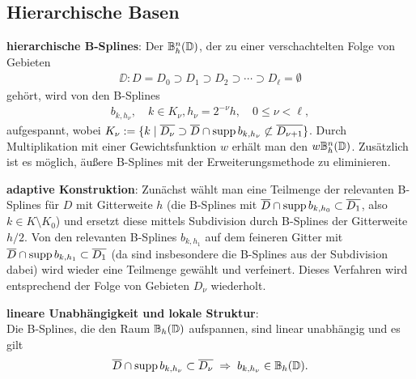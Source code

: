 \subsection{%
    Hierarchische Basen%
}

\textbf{hierarchische B-Splines}:
Der  $\mathbb{B}_h^n(\mathbb{D})$,
der zu einer verschachtelten Folge von Gebieten
\begin{align*}
    \DD\colon D = D_0 \supset D_1 \supset D_2 \supset \dotsb \supset D_\ell = \emptyset
\end{align*}
gehört, wird von den B-Splines
\begin{align*}
    b_{k,h_\nu},\quad
    k \in K_\nu, h_\nu = 2^{-\nu} h,\quad
    0 \le \nu < \ell,
\end{align*}
aufgespannt, wobei $K_\nu := \{k \;|\; \overline{D_\nu} \supset
\overline{D} \cap \operatorname{supp} b_{k,h_\nu} \not\subset \overline{D_{\nu+1}}\}$.
Durch Multiplikation mit einer Gewichtsfunktion $w$ erhält man den
 $w\mathbb{B}_h^n(\mathbb{D})$.
Zusätzlich ist es möglich, äußere B-Splines mit der Erweiterungsmethode zu eliminieren.

\textbf{adaptive Konstruktion}:
Zunächst wählt man eine Teilmenge der relevanten B-Splines für $D$ mit Gitterweite $h$
(die B-Splines mit $\overline{D} \cap \operatorname{supp} b_{k,h_0} \subset \overline{D_1}$, also
$k \in K \setminus K_0$)
und ersetzt diese mittels Subdivision durch B-Splines der Gitterweite $h/2$.
Von den relevanten B-Splines $b_{k,h_1}$ auf dem feineren Gitter mit
$\overline{D} \cap \operatorname{supp} b_{k,h_1} \subset \overline{D_1}$
(da sind insbesondere die B-Splines aus der Subdivision dabei) wird wieder eine Teilmenge
gewählt und verfeinert.
Dieses Verfahren wird entsprechend der Folge von Gebieten $D_\nu$ wiederholt.

\textbf{lineare Unabhängigkeit und lokale Struktur}:\\
Die B-Splines, die den Raum $\mathbb{B}_h(\mathbb{D})$ aufspannen, sind linear unabhängig und es gilt
\begin{align*}
    \overline{D} \cap \operatorname{supp} b_{k,h_\nu} \subset \overline{D_\nu}
    \;\Rightarrow\; b_{k,h_\nu} \in \mathbb{B}_h(\mathbb{D}).
\end{align*}

\pagebreak

